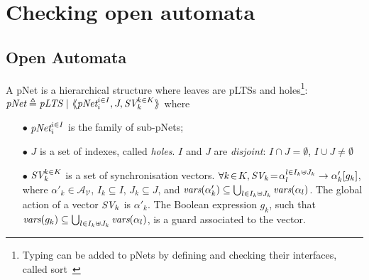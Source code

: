 \documentclass[runningheads,a4paper]{llncs}
\newcommand{\cA}{\ensuremath{\mathcal{A}}}
\newcommand{\cV}{\ensuremath{\mathcal{V}}}
\newcommand{\variables}{\ensuremath{\cV}}
\newcommand{\actions}[1]{\ensuremath{\cA_{#1}}}
\begin{document}
\section{Checking open automata}



\subsection{Open Automata}



\begin{definition}[pNets]\label{def-pnets}
A pNet is a hierarchical structure where leaves are pLTSs and holes\footnote{Typing can 
be added to pNets by defining and checking their interfaces, called 
sort~\cite{HMZ-FORTE2016}}:
$\pNet\triangleq \pLTS~|~\mylangle \pNet_i^{i\in I}, J, \symb{SV}_k^{k\in 
K}\myrangle$
where
\begin{itemize}
\item[$\bullet$] $\pNet_i^{i\in I}$ is the family of sub-pNets;

\item[$\bullet$] $J$ is a set of indexes, called \emph{holes}.
$I$ and $J$ are \emph{disjoint}: $I\!\cap\! J=\emptyset$,  $I\!\cup\! J\neq\emptyset$

\item[$\bullet$] $\symb{SV}_k^{k\in K}$ is a set of
  synchronisation vectors. %
$\forall k\!\in\! K,
  \symb{SV}_k\!=\SV{\!\alpha_{l}^{l\in I_k \uplus J_k}}{\alpha'_k}{g_k}$, where
  $\alpha'_k\in \actions{\variables}$, $I_k\subseteq I$, $J_k\subseteq J$, and 
  $\vars(\alpha'_k)\subseteq \bigcup_{l\in I_k\uplus 
  J_k}{\vars({\alpha_l})}$. The global action of a vector $\symb{SV}_k$ is
$\alpha'_k$. The Boolean expression $g_k $, such that $\vars(g_k)\subseteq \bigcup_{l\in 
I_k\uplus J_k}{\vars({\alpha_l})}$, is a guard associated to the vector.



\end{itemize}
\end{definition}
\end{document}
